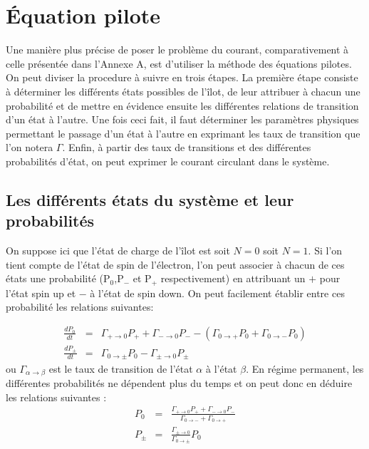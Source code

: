 \chapter{\'Equation pilote}
Une manière plus précise de poser le problème du courant, comparativement à celle présentée dans l'Annexe A, est d'utiliser la méthode des équations pilotes. On peut diviser la procedure à suivre en trois étapes. La première étape consiste à déterminer les différents états possibles de l'\^ilot, de leur attribuer à chacun une probabilité et de mettre en évidence ensuite les différentes relations de transition d'un état à l'autre. Une fois ceci fait, il faut déterminer les paramètres physiques permettant le passage d'un état à l'autre en exprimant les taux de transition que l'on notera $\Gamma$. Enfin, à partir des taux de transitions et des différentes probabilités d'état, on peut exprimer le courant circulant dans le système.

\section{Les différents états du système et leur probabilités}
On suppose ici que l'état de charge de l'\^ilot est soit $N=0$ soit $N=1$. Si l'on tient compte de l'état de spin de l'électron, l'on peut associer à chacun de ces états une probabilité (P$_0$,P$_-$ et P$_+$ respectivement) en attribuant un $+$ pour l'état spin up et $-$ à l'état de spin down. On peut facilement établir entre ces probabilité les relations suivantes:

\begin{eqnarray}
\frac{dP_0}{dt} &=& \Gamma_{+ \rightarrow 0}P_+ + \Gamma_{- \rightarrow 0}P_-  -(\Gamma_{0 \rightarrow +}P_0 + \Gamma_{0 \rightarrow -}P_0) \nonumber \\
\frac{dP_\pm}{dt} &=& \Gamma_{0 \rightarrow \pm}P_0 - \Gamma_{\pm \rightarrow 0}P_\pm \nonumber
\end{eqnarray}
ou $\Gamma_{\alpha \rightarrow \beta}$ est le taux de transition de l'état $\alpha$ à l'état $\beta$. En régime permanent, les différentes probabilités ne dépendent plus du temps et on peut donc en déduire les relations suivantes :
\begin{eqnarray}
P_0 &=& \frac{\Gamma_{+ \rightarrow 0}P_{+} + \Gamma_{- \rightarrow 0}P_{-}}{\Gamma_{0 \rightarrow -} + \Gamma_{0 \rightarrow +} }\\
P_{\pm} &=& \frac{\Gamma_{\pm \rightarrow 0}}{\Gamma_{0 \rightarrow \pm}}P_0 
\end{eqnarray}

